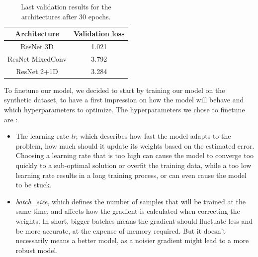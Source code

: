 \documentclass[10pt,conference]{IEEEtran}
\begin{document}
\begin{table}[h!]
\centering
 \begin{tabular}{|c | c |} 
 \hline
    Architecture & Validation loss \\  
 \hline\hline
    ResNet 3D & 1.021\\ 
 \hline
    ResNet MixedConv & 3.792\\
 \hline
    ResNet 2+1D & 3.284\\
 \hline
\end{tabular}
\caption{Last validation results for the architectures after 30 epochs.}
\label{table:comparisonLoss}
\end{table}

To finetune our model, we decided to start by training our model on the synthetic dataset, to have a first impression on how the model will behave and which hyperparameters to optimize. The hyperparameters we chose to finetune are :
\begin{itemize}
  \item The learning rate \textit{lr}, which describes how fast the model adapts to the problem, how much should it update its weights based on the estimated error. Choosing a learning rate that is too high can cause the model to converge too quickly to a sub-optimal solution or overfit the training data, while a too low learning rate results in a long training process, or can even cause the model to be stuck.
  \item \textit{batch\_size}, which defines the number of samples that will be trained at the same time, and affects how the gradient is calculated when correcting the weights. In short, bigger batches means the gradient should fluctuate less and be more accurate, at the expense of memory required. But it doesn't necessarily means a better model, as a noisier gradient might lead to a more robust model.
\end{itemize}
 
\end{document}
